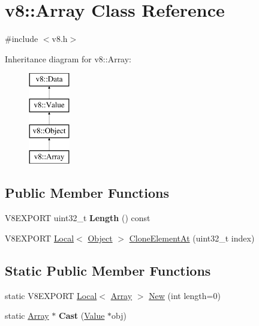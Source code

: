 \hypertarget{classv8_1_1_array}{}\section{v8\+:\+:Array Class Reference}
\label{classv8_1_1_array}


{\ttfamily \#include $<$v8.\+h$>$}

Inheritance diagram for v8\+:\+:Array\+:\begin{figure}[H]
\begin{center}
\leavevmode
\includegraphics[height=4.000000cm]{classv8_1_1_array}
\end{center}
\end{figure}
\subsection*{Public Member Functions}
\begin{DoxyCompactItemize}
\item 
\hypertarget{classv8_1_1_array_a3e56e8707385ea9d6ca515ef7950670e}{}V8\+E\+X\+P\+O\+R\+T uint32\+\_\+t {\bfseries Length} () const \label{classv8_1_1_array_a3e56e8707385ea9d6ca515ef7950670e}

\item 
V8\+E\+X\+P\+O\+R\+T \hyperlink{classv8_1_1_local}{Local}$<$ \hyperlink{classv8_1_1_object}{Object} $>$ \hyperlink{classv8_1_1_array_ac78a0168b8612bcccd789497fd01b2ad}{Clone\+Element\+At} (uint32\+\_\+t index)
\end{DoxyCompactItemize}
\subsection*{Static Public Member Functions}
\begin{DoxyCompactItemize}
\item 
static V8\+E\+X\+P\+O\+R\+T \hyperlink{classv8_1_1_local}{Local}$<$ \hyperlink{classv8_1_1_array}{Array} $>$ \hyperlink{classv8_1_1_array_aabdb62437fce8c3769e69bbf44682066}{New} (int length=0)
\item 
\hypertarget{classv8_1_1_array_ae56792766f8513395c3ebe8c29afde4b}{}static \hyperlink{classv8_1_1_array}{Array} $\ast$ {\bfseries Cast} (\hyperlink{classv8_1_1_value}{Value} $\ast$obj)\label{classv8_1_1_array_ae56792766f8513395c3ebe8c29afde4b}

\end{DoxyCompactItemize}


